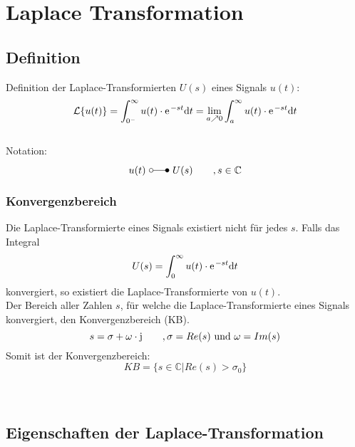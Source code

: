 



\chapter{Laplace Transformation}
\section{Definition}
Definition der Laplace-Transformierten $U(s)$ eines Signals $u(t)$:
\[
	 \lap\{u(t)\} = \int_{0^-}^{\infty} u(t) \cdot \e^{-st} \di t = \lim\limits_{a \nearrow 0} \int_{a}^{\infty}  u(t) \cdot \e^{-st} \di t
\]
\\
Notation:
\[
	u(t) \ \laplace \ U(s) \qquad ,s \in \mathbb{C}
\]

\subsection{Konvergenzbereich}
Die Laplace-Transformierte eines Signals existiert nicht für jedes $s$.
Falls das Integral
\[
	U(s) = \int_{0}^{\infty} u(t) \cdot \e^{-st} \di t
\]
konvergiert, so existiert die Laplace-Transformierte von $u(t)$.\\
Der Bereich aller Zahlen $s$, für welche die Laplace-Transformierte eines Signals konvergiert, den Konvergenzbereich (KB).
\[
	s = \sigma + \omega \cdot \im \qquad , \sigma = Re(s) \text{ und } \omega = Im(s)
\]
Somit ist der Konvergenzbereich:
\[
	KB = \{ s \in \mathbb{C} | Re(s) > \sigma_0 \}
\]
\\\\


\section{Eigenschaften der Laplace-Transformation}
